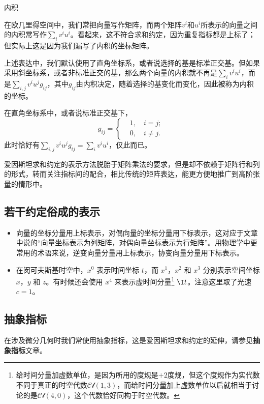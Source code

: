 \begin{example}{内积}

在欧几里得空间中，我们常把向量写作矩阵，而两个矩阵$v^i$和$u^i$所表示的向量之间的内积常写作$\sum_i v^iu^i$。看起来，这不符合求和约定，因为重复指标都是上标了；但实际上这是因为我们漏写了内积的坐标矩阵。

上述表达中，我们默认使用了直角坐标系，或者说选择的基是标准正交基。但如果采用斜坐标系，或者非标准正交的基，那么两个向量的内积就不再是$\sum_i v^iu^i$，而是$\sum_{i, j} v^iu^j g_{ij}$，其中$g_{ij}$由内积决定，随着选择的基变化而变化，因此被称为内积的坐标。

在直角坐标系中，或者说标准正交基下，
\begin{equation}
g_{ij}=
\left\{
    \begin{aligned}
    &1, \quad i=j;\\
    &0, \quad i\not= j. 
    \end{aligned}
\right. ~
\end{equation}
此时恰好有$\sum_{i, j} v^iu^j g_{ij}=\sum_i v^iu^i$，仅此而已。

\end{example}



爱因斯坦求和约定的表示方法脱胎于矩阵乘法的要求，但是却不依赖于矩阵行和列的形式，转而关注指标间的配合，相比传统的矩阵表达，能更方便地推广到高阶张量的情形中。


\subsection{若干约定俗成的表示}
\begin{itemize}
\item 向量的坐标分量用上标表示，对偶向量的坐标分量用下标表示，这对应于文章中说的“向量坐标表示为列矩阵，对偶向量坐标表示为行矩阵”。用物理学中更常用的术语来说，逆变向量分量用上标表示，协变向量分量用下标表示。

\item 在闵可夫斯基时空中，$x^0$ 表示时间坐标 $t$，而 $x^1$，$x^2$ 和 $x^3$ 分别表示空间坐标 $x$，$y$ 和 $z$。有时候还会使用 $x^4$ 来表示虚时间分量\footnote{给时间分量加虚数单位，是因为所用的度规是$+2$度规，但这个度规作为实代数不同于真正的时空代数$\mathcal{Cl}(1, 3)$，而给时间分量加上虚数单位以后就相当于讨论的是$\mathcal{Cl}(4, 0)$，这个代数恰好同构于时空代数。} $\I t$。注意这里取了光速 $c=1$。




\end{itemize}







\subsection{抽象指标}

在涉及微分几何时我们常使用抽象指标，这是爱因斯坦求和约定的延伸，请参见\textbf{抽象指标}文章。




